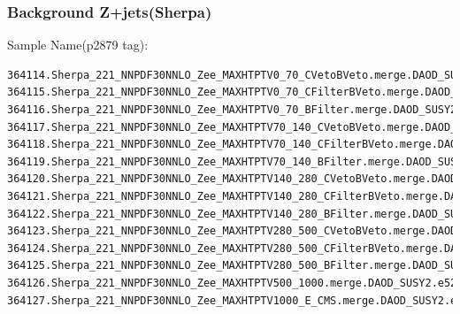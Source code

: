 \documentclass[mathserif,serif]{beamer}
\begin{document}
\begin{frame}[fragile]
\frametitle{Background Z+jets(Sherpa)}
\small
Sample Name(p2879 tag):
\tiny
\begin{verbatim}
364114.Sherpa_221_NNPDF30NNLO_Zee_MAXHTPTV0_70_CVetoBVeto.merge.DAOD_SUSY2.e5299_s2726_r7772_r7676_p2879
364115.Sherpa_221_NNPDF30NNLO_Zee_MAXHTPTV0_70_CFilterBVeto.merge.DAOD_SUSY2.e5299_s2726_r7772_r7676_p2879
364116.Sherpa_221_NNPDF30NNLO_Zee_MAXHTPTV0_70_BFilter.merge.DAOD_SUSY2.e5299_s2726_r7772_r7676_p2879
364117.Sherpa_221_NNPDF30NNLO_Zee_MAXHTPTV70_140_CVetoBVeto.merge.DAOD_SUSY2.e5299_s2726_r7772_r7676_p2879
364118.Sherpa_221_NNPDF30NNLO_Zee_MAXHTPTV70_140_CFilterBVeto.merge.DAOD_SUSY2.e5299_s2726_r7772_r7676_p2879
364119.Sherpa_221_NNPDF30NNLO_Zee_MAXHTPTV70_140_BFilter.merge.DAOD_SUSY2.e5299_s2726_r7772_r7676_p2879
364120.Sherpa_221_NNPDF30NNLO_Zee_MAXHTPTV140_280_CVetoBVeto.merge.DAOD_SUSY2.e5299_s2726_r7772_r7676_p2879
364121.Sherpa_221_NNPDF30NNLO_Zee_MAXHTPTV140_280_CFilterBVeto.merge.DAOD_SUSY2.e5299_s2726_r7772_r7676_p2879
364122.Sherpa_221_NNPDF30NNLO_Zee_MAXHTPTV140_280_BFilter.merge.DAOD_SUSY2.e5299_s2726_r7772_r7676_p2879
364123.Sherpa_221_NNPDF30NNLO_Zee_MAXHTPTV280_500_CVetoBVeto.merge.DAOD_SUSY2.e5299_s2726_r7772_r7676_p2879
364124.Sherpa_221_NNPDF30NNLO_Zee_MAXHTPTV280_500_CFilterBVeto.merge.DAOD_SUSY2.e5299_s2726_r7772_r7676_p2879
364125.Sherpa_221_NNPDF30NNLO_Zee_MAXHTPTV280_500_BFilter.merge.DAOD_SUSY2.e5299_s2726_r7772_r7676_p2879
364126.Sherpa_221_NNPDF30NNLO_Zee_MAXHTPTV500_1000.merge.DAOD_SUSY2.e5299_s2726_r7772_r7676_p2879
364127.Sherpa_221_NNPDF30NNLO_Zee_MAXHTPTV1000_E_CMS.merge.DAOD_SUSY2.e5299_s2726_r7772_r7676_p2879
\end{verbatim}
\end{frame}
\end{document}

